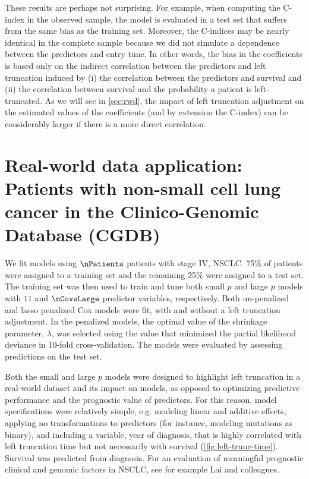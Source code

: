 \documentclass[11pt,final,fleqn]{article}\usepackage[]{graphicx}\usepackage[]{color}
\theoremstyle{plain}
\begin{document}
These results are perhaps not surprising. For example, when computing the C-index in the observed sample, the model is evaluated in a test set that suffers from the same bias as the training set. Moreover, the C-indices may be nearly identical in the complete sample because we did not simulate a dependence between the predictors and entry time. In other words, the bias in the coefficients is based only on the indirect correlation between the predictors and left truncation induced by (i) the correlation between the predictors and survival and (ii) the correlation between survival and the probability a patient is left-truncated. As we will see in \autoref{sec:rwd}, the impact of left truncation adjustment on the estimated values of the coefficients (and by extension the C-index) can be considerably larger if there is a more direct correlation. 

\section{Real-world data application: Patients with non-small cell lung cancer in the Clinico-Genomic Database (CGDB)} \label{sec:rwd}
We fit models using $\nPatients$ patients with stage IV, NSCLC. 75\%  of patients were assigned to a training set and the remaining 25\% were assigned to a test set. The training set was then used to train and tune both small $p$ and large $p$ models with $11$ and $\nCovsLarge$ predictor variables, respectively. Both un-penalized and lasso penalized Cox models were fit, with and without a left truncation adjustment. In the penalized models, the optimal value of the shrinkage parameter,  $\lambda$, was selected using the value that minimized the partial likelihood deviance in 10-fold cross-validation.  The models were evaluated by assessing predictions on the test set.

Both the small and large $p$ models were designed to highlight left truncation in a real-world dataset and its impact on models, as opposed to optimizing predictive performance and the prognostic value of predictors. For this reason, model specifications were relatively simple, e.g. modeling linear and additive effects, applying no transformations to predictors (for instance, modeling mutations as binary), and including a variable, year of diagnosis, that is highly correlated with left truncation time but not necessarily with survival (\autoref{fig:left-trunc-time}). Survival was predicted from diagnosis. For an evaluation of meaningful prognostic clinical and genomic factors in NSCLC, see for example Lai and colleagues\cite{lai2020nsclc}.
\end{document}
